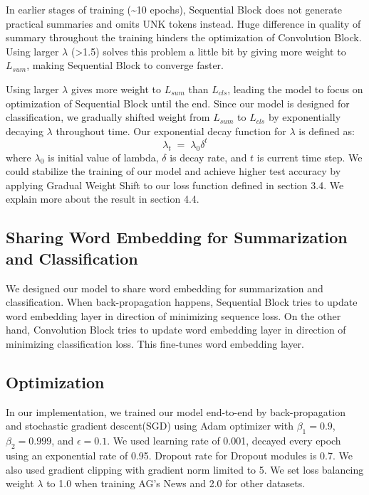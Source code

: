\documentclass{article}
\begin{document}
In earlier stages of training (\textasciitilde10 epochs), Sequential Block does not generate practical summaries and omits UNK tokens instead. Huge difference in quality of summary throughout the training hinders the optimization of Convolution Block. Using larger $\lambda$ (\textgreater1.5) solves this problem a little bit by giving more weight to $L_{sum}$, making Sequential Block to converge faster.

Using larger $\lambda$ gives more weight to $L_{sum}$ than $L_{cls}$, leading the model to focus on optimization of Sequential Block until the end. Since our model is designed for classification, we gradually shifted weight from $L_{sum}$ to $L_{cls}$ by exponentially decaying $\lambda$ throughout time. 
Our exponential decay function for $\lambda$ is defined as:
\begin{equation}
\lambda_{t}\; =\; \lambda_{0}\delta ^{t}
\end{equation}
where $\lambda_0$ is initial value of lambda, $\delta$ is decay rate, and $t$ is current time step. We could stabilize the training of our model and achieve higher test accuracy by applying Gradual Weight Shift to our loss function defined in section 3.4. We explain more about the result in section 4.4. 

\subsection{Sharing Word Embedding for Summarization and Classification}
We designed our model to share word embedding for summarization and classification. When back-propagation happens, Sequential Block tries to update word embedding layer in direction of minimizing sequence loss. On the other hand, Convolution Block tries to update word embedding layer in direction of minimizing classification loss. This fine-tunes word embedding layer. 

\subsection{Optimization}
In our implementation, we trained our model end-to-end by back-propagation and stochastic gradient descent(SGD)\cite{SGD} using Adam optimizer\cite{DBLP:journals/corr/KingmaB14} with $\beta_{1}=0.9$, $\beta_{2}=0.999$, and $\epsilon = 0.1$. We used learning rate of 0.001, decayed every epoch using an exponential rate of 0.95. Dropout rate for Dropout\cite{JMLR:v15:srivastava14a} modules is 0.7. We also used gradient clipping\cite{DBLP:journals/corr/abs-1211-5063} with gradient norm limited to 5. We set loss balancing weight $\lambda$ to 1.0 when training AG's News and 2.0 for other datasets.
\end{document}
